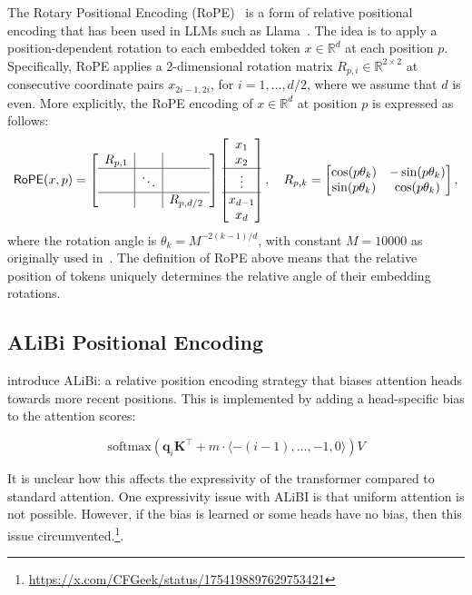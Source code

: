 The Rotary Positional Encoding (RoPE)~\citep{su2024roformer} is a form of relative positional encoding that has been used in LLMs such as Llama~\citep{touvron2023llama}.
The idea is to apply a position-dependent rotation to each embedded token \(x \in \mathbb{R}^d\) at each position \(p\).
Specifically, RoPE applies a 2-dimensional rotation matrix \(R_{p,i} \in \mathbb{R}^{2 \times 2}\) at consecutive coordinate pairs \(x_{2i-1, 2i}\), for \(i = 1, \ldots, d/2\), where we assume that \(d\) is even.
More explicitly, the RoPE encoding of \(x \in \mathbb{R}^{d}\) at position \(p\) is expressed as follows:
\begin{equation}
\mathsf{RoPE}(x, p)
    = \left[\begin{array}{c|c|c}
            R_{p,1} & & \\
            \hline
            & \ddots & \\
            \hline
            & & R_{p, d/2}
        \end{array}\right]
        \begin{bmatrix}
            x_1 \\ x_2 \\
            \hline \vdots \\
            \hline
            x_{d-1} \\ x_{d}
        \end{bmatrix},
        \quad R_{p,k} = \begin{bmatrix}
            \cos (p \theta_k) & -\sin (p \theta_k) \\
            \sin (p \theta_k) & \cos (p \theta_k)
        \end{bmatrix},
\end{equation}
where the rotation angle is \(\theta_k = M^{-2(k-1)/d}\), with constant \(M = 10000\) as originally used in~\citep{su2024roformer}.
The definition of RoPE above means that the relative position of tokens uniquely determines the relative angle of their embedding rotations.



\subsection{ALiBi Positional Encoding}

\citet{press2022train} introduce ALiBi: a relative position encoding strategy that biases attention heads towards more recent positions.
This is implemented by adding a head-specific bias to the attention scores:

\begin{equation*}
    \mathrm{softmax}\left( \mathbf q_i \mathbf K^\top + m \cdot \langle -(i-1), \ldots, -1, 0 \rangle \right)V
\end{equation*}

It is unclear how this affects the expressivity of the transformer compared to standard attention.
One expressivity issue with ALiBI is that uniform attention is not possible.
However, if the bias is learned or some heads have no bias, then this issue circumvented.\footnote{\url{https://x.com/CFGeek/status/1754198897629753421}}.
